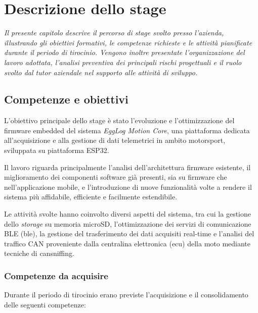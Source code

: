 \chapter{Descrizione dello stage}
\label{chap:descrizione-stage}

\textit{Il presente capitolo descrive il percorso di stage svolto presso l'azienda, illustrando gli obiettivi formativi,
le competenze richieste e le attività pianificate durante il periodo di tirocinio. Vengono inoltre presentate
l'organizzazione del lavoro adottata, l'analisi preventiva dei principali rischi progettuali e il ruolo svolto
dal tutor aziendale nel supporto alle attività di sviluppo.}

\section{Competenze e obiettivi}

L'obiettivo principale dello stage è stato l'evoluzione e l'ottimizzazione del firmware embedded del sistema
\textit{EggLog Motion Core}, una piattaforma dedicata all'acquisizione e alla gestione di dati telemetrici
in ambito motorsport, sviluppata su piattaforma ESP32.

Il lavoro riguarda principalmente l'analisi dell'architettura firmware esistente, il miglioramento dei
componenti software già presenti, sia su firmware che nell'applicazione mobile, e l'introduzione di nuove funzionalità 
volte a rendere il sistema più affidabile, efficiente e facilmente estendibile.

Le attività svolte hanno coinvolto diversi aspetti del sistema, tra cui la gestione dello \textit{storage}
su memoria microSD, l'ottimizzazione dei servizi di comunicazione BLE (\gls{ble}), la gestione del
trasferimento dei dati acquisiti real-time e l'analisi del traffico CAN proveniente dalla centralina elettronica
(\gls{ecu}) della moto mediante tecniche di \gls{cansniffing}.

\subsection{Competenze da acquisire}

Durante il periodo di tirocinio erano previste l'acquisizione e il consolidamento delle seguenti competenze:

